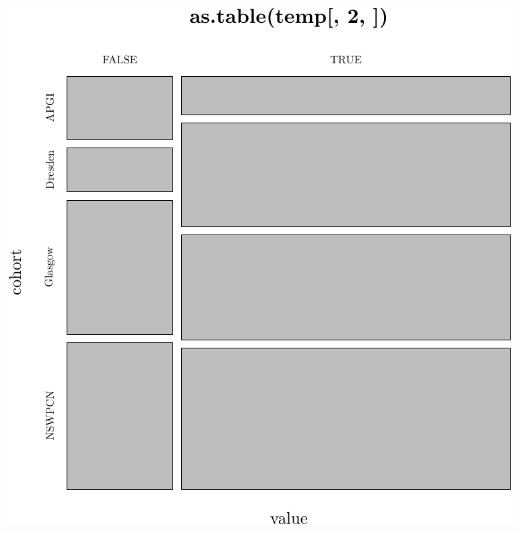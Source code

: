 \documentclass{article}\usepackage[]{graphicx}\usepackage[]{color}
\makeatletter
\def\maxwidth{ %
  \ifdim\Gin@nat@width>\linewidth
    \linewidth
  \else
    \Gin@nat@width
  \fi
}
\newenvironment{knitrout}{}{} %
\makeatother
\begin{document}
\begin{knitrout}
{\centering \includegraphics[width=\maxwidth]{figure/07-data-summaries-3} 

}



\end{knitrout}
\end{document}
